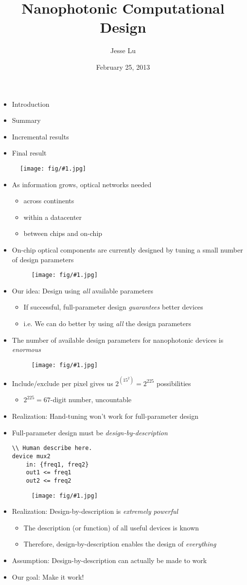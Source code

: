 \documentclass[landscape]{foils}
\title{Nanophotonic Computational Design}
\author{Jesse Lu}
\date{February 25, 2013}
\newcommand{\nextpage}{\vfill\newpage}
\renewcommand{\oursection}[1]{
\foilhead[-1.0cm]{#1}
}
\newcommand{\smallfig}[1]{
    \begin{figure}[!h]
    \centerline{\texttt{[image: fig/\#1.jpg]}}
    \end{figure}
}
\newcommand{\BI}{\begin{itemize}\item}
\newcommand{\I}{\item}
\newcommand{\EI}{\end{itemize}}
\begin{document}
\setlength{\parskip}{0cm}
\maketitle
\begin{itemize} \itemsep -1pt
\I  Introduction
\I  Summary
\I  Incremental results
\I  Final result
\EI


\nextpage

\oursection{Introduction}
\smallfig{optical_networks}
\BI As information grows, optical networks needed
    \BI across continents
    \I  within a datacenter
    \I  between chips and on-chip \EI
\nextpage

\I  On-chip optical components are currently designed
    by tuning a small number of design parameters
\smallfig{integrated_circuit}
\pause
\I  Our idea: Design using \emph{all} available parameters
    \BI If successful, full-parameter design \emph{guarantees} better devices 
    \I  i.e. We can do better by using \emph{all} the design parameters \EI

\nextpage

\I The number of available design parameters for nanophotonic devices
    is \emph{enormous}
\smallfig{des_complexity}
\pause
\I  Include/exclude per pixel gives us $2^{(15^2)} = 2^{225}$ possibilities
    \BI $2^{225} = 67$-digit number, uncountable \EI
\pause
\I  Realization: Hand-tuning won't work for full-parameter design
\nextpage

\I  Full-parameter design must be \emph{design-by-description}
\pause
\begin{verbatim}
\\ Human describe here.
device mux2 
    in: {freq1, freq2}
    out1 <= freq1
    out2 <= freq2
\end{verbatim}
\pause
\smallfig{thesolution}
\nextpage

\I  Realization: Design-by-description is \emph{extremely powerful}
\pause
    \BI The description (or function) of all useful devices is known
    \I  Therefore, design-by-description enables the design of \emph{everything} 
    \EI
\pause
\I  Assumption: Design-by-description can actually be made to work
\pause
\I  Our goal: Make it work!


\end{itemize}
\end{document}
